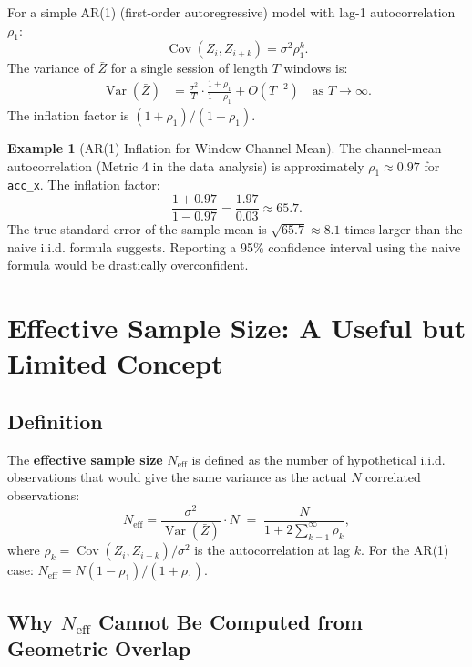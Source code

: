 \documentclass[11pt, a4paper]{article}
\theoremstyle{definition}
\newtheorem{example}{Example}[section]
\theoremstyle{plain}
\newcommand{\Cov}{\operatorname{Cov}}
\newcommand{\Var}{\operatorname{Var}}
\newcommand{\code}[1]{\texttt{#1}}
\begin{document}
For a simple AR(1) (first-order autoregressive) model with lag-1 autocorrelation $\rho_1$:
\[
  \Cov(Z_i, Z_{i+k}) = \sigma^2 \rho_1^k.
\]
The variance of $\bar{Z}$ for a single session of length $T$ windows is:
\begin{align}
  \Var(\bar{Z}) &= \frac{\sigma^2}{T} \cdot \frac{1 + \rho_1}{1 - \rho_1}
  + O(T^{-2}) \quad \text{as } T \to \infty.
\end{align}
The inflation factor is $(1 + \rho_1)/(1 - \rho_1)$.

\begin{example}[AR(1) Inflation for Window Channel Mean]
  The channel-mean autocorrelation (Metric 4 in the data analysis) is approximately
  $\rho_1 \approx 0.97$ for \code{acc\_x}. The inflation factor:
  \[
    \frac{1 + 0.97}{1 - 0.97} = \frac{1.97}{0.03} \approx 65.7.
  \]
  The true standard error of the sample mean is $\sqrt{65.7} \approx 8.1$ times
  larger than the naive i.i.d. formula suggests. Reporting a 95\% confidence
  interval using the naive formula would be drastically overconfident.
\end{example}

\section{Effective Sample Size: A Useful but Limited Concept}

\subsection{Definition}

The \textbf{effective sample size} $N_{\text{eff}}$ is defined as the number of
hypothetical i.i.d. observations that would give the same variance as the actual
$N$ correlated observations:
\begin{equation}
  N_{\text{eff}} = \frac{\sigma^2}{\Var(\bar{Z})} \cdot N
  \;=\; \frac{N}{1 + 2 \sum_{k=1}^{\infty} \rho_k},
\end{equation}
where $\rho_k = \Cov(Z_i, Z_{i+k})/\sigma^2$ is the autocorrelation at lag $k$.
For the AR(1) case: $N_{\text{eff}} = N(1 - \rho_1)/(1 + \rho_1)$.

\subsection{Why $N_{\text{eff}}$ Cannot Be Computed from Geometric Overlap}
\end{document}
